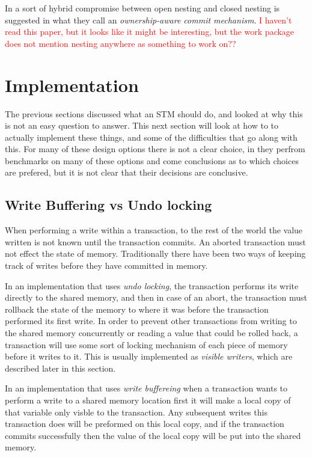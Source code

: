 In \cite{1378553} a sort of hybrid compromise between open nesting and closed nesting is suggested in what they call an \emph{ownership-aware commit mechanism}.
\textcolor{Red}{I haven't read this paper, but it looks like it might be interesting, but the work package does not mention nesting anywhere as something to work on??}















\section{Implementation}
The previous sections discussed what an STM should do, and looked at why this is not an easy question to answer.
This next section will look at how to to actually implement these things, and some of the difficulties that go along with this.
For many of these design options there is not a clear choice, in \cite{1123001} they perfrom benchmarks on many of these options and come conclusions as to which choices are prefered, but it is not clear that their decisions are conclusive.

\subsection{Write Buffering vs Undo locking}
When performing a write within a transaction, to the rest of  the world the value written is not known until the transaction commits.
An aborted transaction must not effect the state of memory.
Traditionally there have been two ways of keeping track of writes before they have committed in memory.

In an implementation that uses \emph{undo locking}, the transaction performs its write directly to the shared memory, and then in case of an abort, the transaction must rollback the state of the memory to where it was before the transaction performed its first write.
In order to prevent other transactions from writing to the shared memory concurrently or reading a value that could be rolled back, a transaction will use some sort of locking mechanism of each piece of memory before it writes to it.
This is usually implemented as \emph{visible writers}, which are described later in this section.

In an implementation that uses \emph{write buffereing} when a transaction wants to perform a write to a shared memory location first it will make a local copy of that variable only visble to the transaction.
Any subsequent writes this transaction does will be preformed on this local copy, and if the transaction commits successfully then the value of the local copy will be put into the shared memory.

